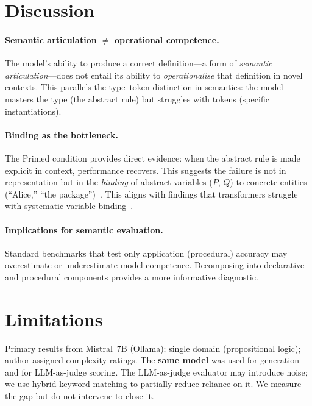 \documentclass[11pt]{article}
\begin{document}
\section{Discussion}

\paragraph{Semantic articulation $\neq$ operational competence.}
The model's ability to produce a correct definition---a form of
\emph{semantic articulation}---does not entail its ability to
\emph{operationalise} that definition in novel contexts.
This parallels the type--token distinction in semantics: the model
masters the type (the abstract rule) but struggles with tokens
(specific instantiations).

\paragraph{Binding as the bottleneck.}
The Primed condition provides direct evidence: when the abstract
rule is made explicit in context, performance recovers.
This suggests the failure is not in representation but in the
\emph{binding} of abstract variables ($P$, $Q$) to concrete
entities (``Alice,'' ``the package'')~\cite{greff2020binding}.
This aligns with findings that transformers struggle with systematic
variable binding~\cite{webb2024systematic}.

\paragraph{Implications for semantic evaluation.}
Standard benchmarks that test only application (procedural) accuracy
may overestimate or underestimate model competence.
Decomposing into declarative and procedural components provides a
more informative diagnostic.

\section{Limitations}

Primary results from Mistral~7B (Ollama); single domain (propositional
logic); author-assigned complexity ratings.
The \textbf{same model} was used for generation and for LLM-as-judge scoring.
The LLM-as-judge evaluator may introduce noise; we use hybrid keyword matching to partially reduce reliance on it.
We measure the gap but do not intervene to close it.
\end{document}
